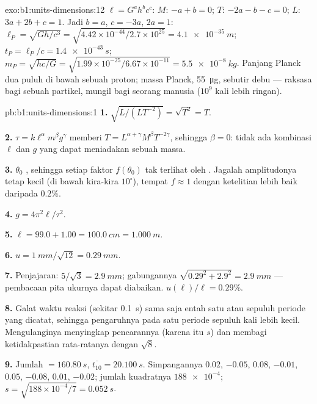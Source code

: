 \begin{solution}{exo:b1:units-dimensions:12}
$\ell = G^a h^b c^c$: $M$: $-a + b = 0$; $T$: $-2a - b - c = 0$; $L$:
$3a + 2b + c = 1$. Jadi $b = a$, $c = -3a$, $2a = 1$:
$\ell_P = \sqrt{Gh/c^3} = \sqrt{4.42\times10^{-44}/2.7\times10^{25}}
= \qty{4.1e-35}{m}$; $t_P = \ell_P/c = \qty{1.4e-43}{s}$;
$m_P = \sqrt{hc/G} = \sqrt{1.99\times10^{-25}/6.67\times10^{-11}}
= \qty{5.5e-8}{kg}$. Panjang Planck dua puluh  di bawah
sebuah proton; massa Planck, \qty{55}{\micro g}, sebutir debu ---
raksasa bagi sebuah partikel, mungil bagi seorang manusia ($10^9$ kali
lebih ringan).
\end{solution}

\begin{solution}{pb:b1:units-dimensions:1}
\textbf{1.} $\sqrt{L/(L T^{-2})} = \sqrt{T^2} = T$.

\textbf{2.} $\tau = k\ell^\alpha m^\beta g^\gamma$ memberi
$T = L^{\alpha+\gamma} M^\beta T^{-2\gamma}$, sehingga $\beta = 0$: tidak ada
kombinasi $\ell$ dan $g$ yang dapat meniadakan sebuah massa.

\textbf{3.} $\theta_0$ , sehingga setiap faktor $f(\theta_0)$
tak terlihat oleh . Jagalah amplitudonya tetap kecil (di bawah kira-kira
$10^\circ$), tempat $f \approx 1$ dengan ketelitian lebih baik daripada $0.2\%$.

\textbf{4.} $g = 4\pi^2\ell/\tau^2$.

\textbf{5.} $\ell = 99.0 + 1.00 = \qty{100.0}{cm} = \qty{1.000}{m}$.

\textbf{6.} $u = \qty{1}{mm}/\sqrt{12} = \qty{0.29}{mm}$.

\textbf{7.} Penjajaran: $5/\sqrt3 = \qty{2.9}{mm}$; gabungannya
$\sqrt{0.29^2 + 2.9^2} = \qty{2.9}{mm}$ --- pembacaan pita ukurnya dapat
diabaikan. $u(\ell)/\ell = 0.29\%$.

\textbf{8.} Galat waktu reaksi (sekitar \qty{0.1}{s}) sama saja entah satu
atau sepuluh periode yang dicatat, sehingga pengaruhnya pada satu periode
sepuluh kali lebih kecil. Mengulanginya menyingkap pencarannya (karena itu $s$)
dan membagi ketidakpastian rata-ratanya dengan $\sqrt8$.

\textbf{9.} Jumlah $= \qty{160.80}{s}$, $\overline{t_{10}} = \qty{20.100}{s}$.
Simpangannya $0.02$, $-0.05$, $0.08$, $-0.01$, $0.05$, $-0.08$, $0.01$,
$-0.02$; jumlah kuadratnya $\num{188e-4}$; $s = \sqrt{188\times10^{-4}/7} = \qty{0.052}{s}$.


\end{solution}
